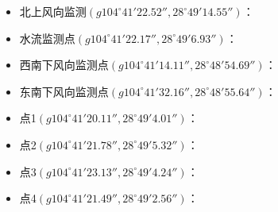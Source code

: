 \begin{itemize}
    \item 北上风向监测$(g104^{\circ}41'22.52'',28^{\circ}49'14.55'')$：
    \item 水流监测点$(g104^{\circ}41'22.17'',28^{\circ}49'6.93'')$：
    \item 西南下风向监测点$(g104^{\circ}41'14.11'',28^{\circ}48'54.69'')$：
    \item 东南下风向监测点$(g104^{\circ}41'32.16'',28^{\circ}48'55.64'')$：
    \item 点1$(g104^{\circ}41'20.11'',28^{\circ}49'4.01'')$：
    \item 点2$(g104^{\circ}41'21.78'',28^{\circ}49'5.32'')$：
    \item 点3$(g104^{\circ}41'23.13'',28^{\circ}49'4.24'')$：
    \item 点4$(g104^{\circ}41'21.49'',28^{\circ}49'2.56'')$：
\end{itemize}

  